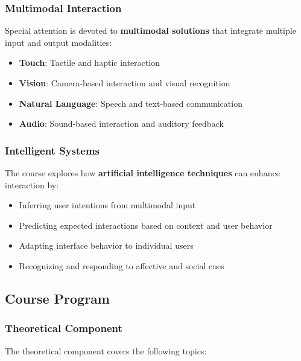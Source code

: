 \documentclass[11pt,a4paper]{article}
\theoremstyle{definition}
\theoremstyle{plain}
\theoremstyle{remark}
\begin{document}
\subsubsection{Multimodal Interaction}

\begin{tcolorbox}[colback=blue!5!white,colframe=blue!75!black,title=\textbf{Multimodal Input and Output Modalities}]
Special attention is devoted to \textbf{multimodal solutions} that integrate multiple input and output modalities:
\begin{itemize}
    \item \textbf{Touch}: Tactile and haptic interaction
    \item \textbf{Vision}: Camera-based interaction and visual recognition
    \item \textbf{Natural Language}: Speech and text-based communication
    \item \textbf{Audio}: Sound-based interaction and auditory feedback
\end{itemize}
\end{tcolorbox}

\subsubsection{Intelligent Systems}

The course explores how \textbf{artificial intelligence techniques} can enhance interaction by:
\begin{itemize}
    \item Inferring user intentions from multimodal input
    \item Predicting expected interactions based on context and user behavior
    \item Adapting interface behavior to individual users
    \item Recognizing and responding to affective and social cues
\end{itemize}

\subsection{Course Program}

\subsubsection{Theoretical Component}

The theoretical component covers the following topics:
\end{document}
